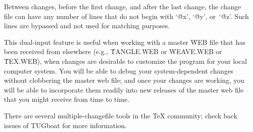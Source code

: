 Between changes, before the first change, and after the last change,
the change file can have any number of lines that do not begin with
`\.{@x}', `\.{@y}', or~`\.{@z}'.
Such lines are bypassed and not used for
matching purposes.

This dual-input feature is useful when working with a master \.{WEB} file
that has been received from elsewhere (e.g., \.{TANGLE.WEB} or
\.{WEAVE.WEB} or \.{TEX.WEB}), when changes are desirable to customize the
program for your local computer system.
You will be able to debug your
system-dependent changes without clobbering the master web file; and once
your changes are working, you will be able to incorporate them readily
into new releases of the master web file that you might receive from time
to time.

\newstuff
There are several multiple-changefile tools in the {\TeX} community;
check back issues of TUGboat for more information.
\endnewstuff

